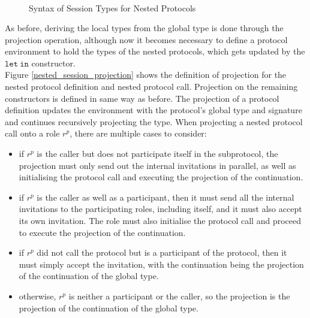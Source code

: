 \documentclass[12pt,twoside]{report}
\begin{document}
\begin{figure}[h]
\begin{equation*}
\begin{array}{rrlr}
        \end{array}
    \end{equation*}
    \caption{Syntax of Session Types for Nested Protocols}
    \label{nested_session_types}
\end{figure}{}

As before, deriving the local types from the global type is done through the projection operation, although now it becomes necessary to define a protocol environment to hold the types of the nested protocols, which gets updated by the $\mathtt{let}\ \mathtt{in}$ constructor.\\ 

Figure \ref{nested_session_projection} shows the definition of projection for the nested protocol definition and nested protocol call. Projection on the remaining constructors is defined in same way as before. The projection of a protocol definition updates the environment with the protocol's global type and signature and continues recursively projecting the type. When projecting a nested protocol call onto a role $r^p$, there are multiple cases to consider:
\begin{itemize}
    \item if $r^p$ is the caller but does not participate itself in the subprotocol, the projection must only send out the internal invitations in parallel, as well as initialising the protocol call and executing the projection of the continuation.
    \item if $r^p$ is the caller as well as a participant, then it must send all the internal invitations to the participating roles, including itself, and it must also accept its own invitation. The role must also initialise the protocol call and proceed to execute the projection of the continuation.
    \item if $r^p$ did not call the protocol but is a participant of the protocol, then it must simply accept the invitation, with the continuation being the projection of the continuation of the global type.
    \item otherwise, $r^p$ is neither a participant or the caller, so the projection is the projection of the continuation of the global type.
\end{itemize}
\end{document}
